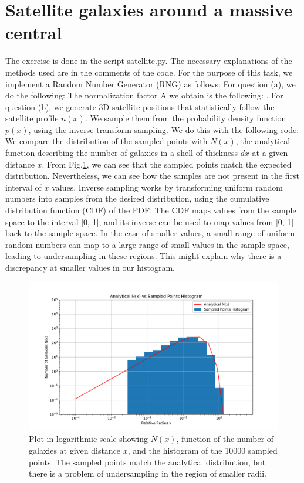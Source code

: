 \section{Satellite galaxies around a massive central}
The exercise is done in the script satellite.py. The necessary explanations of the methods used are in the comments of the code. For the purpose of this task, we implement a Random Number Generator (RNG) as follows: 
For question (a), we do the following:  The normalization factor A we obtain is the following: .
For question (b), we generate 3D satellite positions that statistically follow the satellite profile $n(x)$. We sample them from the probability density function $p(x)$, using the inverse transform sampling. We do this with the following code: 
We compare the distribution of the sampled points with $N(x)$, the analytical function describing the number of galaxies in a shell of thickness $dx$ at a given distance $x$. From Fig.\ref{fig:n_vs_hist}, we can see that the sampled points match the expected distribution. Nevertheless, we can see how the samples are not present in the first interval of $x$ values. Inverse sampling works by transforming uniform random numbers into samples from the desired distribution, using the cumulative distribution function (CDF) of the PDF. The CDF maps values from the sample space to the interval [0, 1], and its inverse can be used to map values from [0, 1] back to the sample space. In the case of smaller values, a small range of uniform random numbers can map to a large range of small values in the sample space, leading to undersampling in these regions. This might explain why there is a discrepancy at smaller values in our histogram.

\begin{figure}[h!]
  \centering
  \includegraphics[width=0.9\linewidth]{./plots/my_solution_1b.png}
  \caption{Plot in logarithmic scale showing $N(x)$, function of the number of galaxies at given distance $x$, and the histogram of the 10000 sampled points. The sampled points match the analytical distribution, but there is a problem of undersampling in the region of smaller radii.}
  \label{fig:n_vs_hist}
\end{figure}

